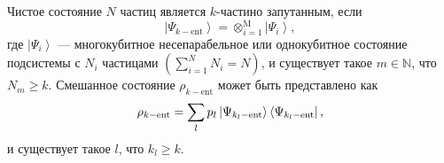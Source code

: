 Чистое состояние $N$ частиц является $k$-частино запутанным, если
%
\begin{equation}
  \left| \Psi_{k-\mathrm{ent}} \right\rangle
  = \otimes^\mathrm{M}_{i=1} \left| \Psi_{i} \right\rangle,
\end{equation}
%
где $\left| \Psi_{i} \right\rangle$ --- многокубитное несепарабельное или однокубитное состояние подсистемы с $N_i$ частицами
$\left( \sum_{i=1}^N N_i = N \right)$,
и существует такое  $ m \in \mathbb{N}$, что $N_{m} \ge k$.
Смешанное состояние $\rho_{k-\mathrm{ent}}$ может быть представлено как
%
\begin{equation}
  \rho_{k-\mathrm{ent}} =
  \sum\limits_{l} p_l \left| \Psi_{k_l-\mathrm{ent}} \right\rangle\left\langle \Psi_{k_l-\mathrm{ent}} \right|,
  \end{equation}
%
и существует такое $l$, что $k_l \geq k$.
